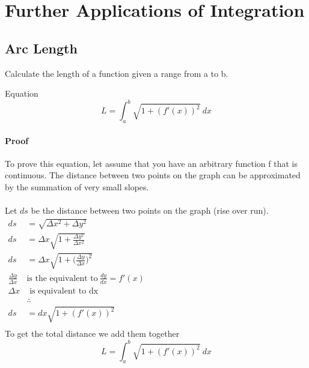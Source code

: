 \documentclass[letterpaper,10pt,twoside,twocolumn,openany]{book}
\begin{document}
\chapter{Further Applications of Integration}
\section{Arc Length}
Calculate the length of a function given a range from a to b.
\begin{DndSidebar}{Equation}
    \begin{equation}
        L = \int_a^b \sqrt{1 + (f'(x))^2}\ dx
    \end{equation}
\end{DndSidebar}
\subsubsection{Proof}
To prove this equation, let assume that you have an arbitrary function f that is continuous. The distance between two points on the graph can be approximated by the summation of very small slopes.
\\~\\ 
Let $ds$ be the distance between two points on the graph (rise over run).\\  
$\begin{aligned}
    ds &= \sqrt{\Delta x^2 + \Delta y^2}\\ 
    ds &= \Delta x \sqrt{1 + \frac{\Delta y^2}{\Delta x^2}}\\ 
    ds &= \Delta x \sqrt{1 + \biggl(\frac{\Delta y}{\Delta x}\biggl)^2}\\
    \frac{\Delta y}{\Delta x}\ &\text{is the equivalent to}\ \frac{dy}{dx} = f'(x)\\
    \Delta x &\text{ is equivalent to dx}\\
    &\therefore\\ 
    ds &= dx \sqrt{1 + (f'(x))^2}\\
\end{aligned}$\\
To get the total distance we add them together 
\begin{equation*}
    L = \int_a^b \sqrt{1 + (f'(x))^2}\ dx
\end{equation*}
\end{document}
